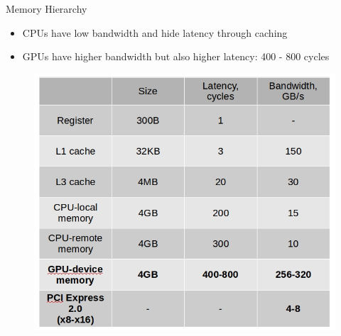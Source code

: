\documentclass[9pt]{beamer}
\begin{document}
\begin{frame}{Memory Hierarchy}


\begin{itemize}

	\item  CPUs have low bandwidth and hide latency through caching
    
    \item GPUs have higher bandwidth but also higher latency: 400 - 800 cycles  

\end{itemize}
\pause
\begin{figure}
\begin{center}
\includegraphics[scale=0.3]{images/latency-bandwidth.jpg}
\end{center}
\end{figure}

\end{frame}

\end{document}
